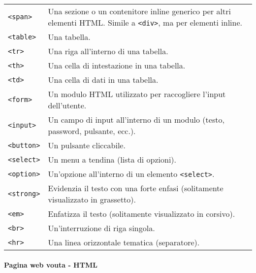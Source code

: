 \documentclass[italian,a4paper]{article}
\begin{document}
\begin{longtable}[]{@{}
  >{\raggedright\arraybackslash}p{}
  >{\raggedright\arraybackslash}p{}@{}}
\texttt{\textless{}span\textgreater{}} & Una sezione o un contenitore
inline generico per altri elementi HTML. Simile a
\texttt{\textless{}div\textgreater{}}, ma per elementi inline. \\
\texttt{\textless{}table\textgreater{}} & Una tabella. \\
\texttt{\textless{}tr\textgreater{}} & Una riga all'interno di una
tabella. \\
\texttt{\textless{}th\textgreater{}} & Una cella di intestazione in una
tabella. \\
\texttt{\textless{}td\textgreater{}} & Una cella di dati in una
tabella. \\
\texttt{\textless{}form\textgreater{}} & Un modulo HTML utilizzato per
raccogliere l'input dell'utente. \\
\texttt{\textless{}input\textgreater{}} & Un campo di input all'interno
di un modulo (testo, password, pulsante, ecc.). \\
\texttt{\textless{}button\textgreater{}} & Un pulsante cliccabile. \\
\texttt{\textless{}select\textgreater{}} & Un menu a tendina (lista di
opzioni). \\
\texttt{\textless{}option\textgreater{}} & Un'opzione all'interno di un
elemento \texttt{\textless{}select\textgreater{}}. \\
\texttt{\textless{}strong\textgreater{}} & Evidenzia il testo con una
forte enfasi (solitamente visualizzato in grassetto). \\
\texttt{\textless{}em\textgreater{}} & Enfatizza il testo (solitamente
visualizzato in corsivo). \\
\texttt{\textless{}br\textgreater{}} & Un'interruzione di riga
singola. \\
\texttt{\textless{}hr\textgreater{}} & Una linea orizzontale tematica
(separatore). \\
\end{longtable}

\paragraph{Pagina web vouta - HTML}\label{pagina-web-vouta---html}
\end{document}

